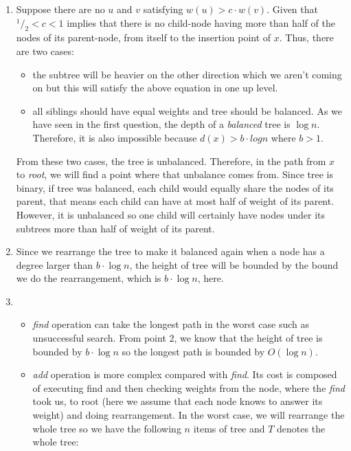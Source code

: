 \begin{enumerate}
  \item
     Suppose there are no $u$ and $v$ satisfying $w(u) > c \cdot w(v)$. Given that $^1/_2 < c < 1$ implies that there is no child-node having more than half of the nodes of its parent-node, from itself to the insertion point of $x$. Thus, there are two cases: 
    \begin{itemize}
      \item 
      the subtree will be heavier on the other direction which we aren't coming on but this will satisfy the above equation in one up level.
      
      \item 
      all siblings should have equal weights and tree should be  balanced. As we have seen in the first question, the depth of a \textit{balanced} tree is $\log n$. Therefore, it is also impossible because $d(x) > b \cdot log n$ where $b > 1$.
    \end{itemize}        

    From these two cases, the tree is unbalanced. Therefore, in the path from $x$ to \textit{root}, we will find a point where that unbalance comes from. Since tree is binary, if tree was balanced, each child would equally share the nodes of its parent, that means each child can have at most half of weight of its parent. However, it is unbalanced so one child will certainly have nodes under its subtrees more than half of weight of its parent.
    
  \item
   Since we rearrange the tree to make it balanced again when a node has a degree larger than $b \cdot \log n$, the height of tree will be bounded by the bound we do the rearrangement, which is $b \cdot \log n$, here.
  
  \item
  \begin{itemize}
    \item \textit{find} operation can take the longest path in the worst case such as unsuccessful search. From point $2$, we know that the height of tree is bounded by $b \cdot \log n$ so the longest path is bounded by $O(\log n)$.
    
    \item \textit{add} operation is more complex compared with \textit{find}. Its cost is composed of executing find and then checking weights from the node, where the \textit{find} took us, to root (here we assume that each node knows to answer its weight) and doing rearrangement. In the worst case, we will rearrange the whole tree so we have the following $n$ items of tree and $T$ denotes the whole tree:
    

\end{itemize}
\end{enumerate}
